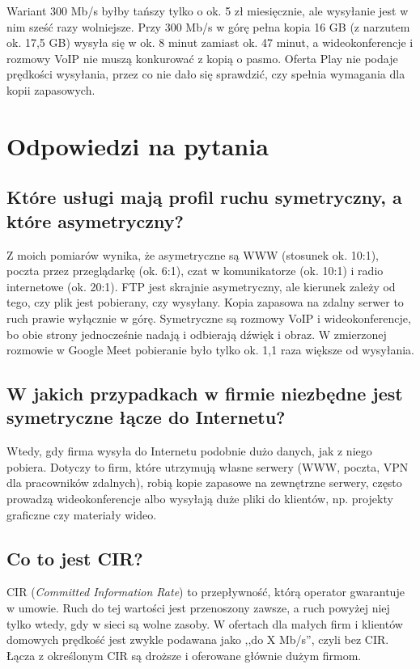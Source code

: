 \documentclass[12pt,a4paper]{article}
\begin{document}
Wariant 300 Mb/s byłby tańszy tylko o ok. 5 zł miesięcznie, ale wysyłanie jest w nim sześć razy
wolniejsze. Przy 300 Mb/s w górę pełna kopia 16 GB (z narzutem ok. 17,5 GB) wysyła się w ok. 8 minut zamiast ok. 47 minut,
a wideokonferencje i rozmowy VoIP nie muszą konkurować z kopią o pasmo. Oferta Play nie podaje
prędkości wysyłania, przez co nie dało się sprawdzić, czy spełnia wymagania dla kopii zapasowych.

\section{Odpowiedzi na pytania}

\subsection{Które usługi mają profil ruchu symetryczny, a które asymetryczny?}

Z moich pomiarów wynika, że asymetryczne są WWW (stosunek ok. 10:1), poczta przez przeglądarkę
(ok. 6:1), czat w komunikatorze (ok. 10:1) i radio internetowe (ok. 20:1). FTP jest skrajnie
asymetryczny, ale kierunek zależy od tego, czy plik jest pobierany, czy wysyłany. Kopia zapasowa
na zdalny serwer to ruch prawie wyłącznie w górę. Symetryczne są rozmowy VoIP i wideokonferencje,
bo obie strony jednocześnie nadają i odbierają dźwięk i obraz. W zmierzonej rozmowie w Google Meet
pobieranie było tylko ok. 1,1 raza większe od wysyłania.

\subsection{W jakich przypadkach w firmie niezbędne jest symetryczne łącze do Internetu?}

Wtedy, gdy firma wysyła do Internetu podobnie dużo danych, jak z niego pobiera. Dotyczy to firm,
które utrzymują własne serwery (WWW, poczta, VPN dla pracowników zdalnych), robią kopie zapasowe
na zewnętrzne serwery, często prowadzą wideokonferencje albo wysyłają duże pliki do klientów,
np. projekty graficzne czy materiały wideo.

\subsection{Co to jest CIR?}

CIR (\emph{Committed Information Rate}) to przepływność, którą operator gwarantuje w umowie.
Ruch do tej wartości jest przenoszony zawsze, a ruch powyżej niej tylko wtedy, gdy w sieci są wolne
zasoby. W ofertach dla małych firm i klientów domowych prędkość jest zwykle podawana jako
,,do X Mb/s'', czyli bez CIR. Łącza z określonym CIR są droższe i oferowane głównie dużym firmom.
\end{document}
